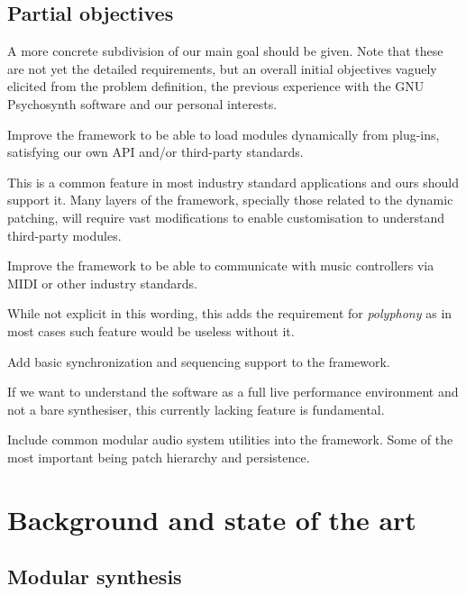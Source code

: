 \subsection{Partial objectives}

A more concrete subdivision of our main goal should be given. Note
that these are not yet the detailed requirements, but an overall
initial objectives vaguely elicited from the problem definition, the
previous experience with the GNU Psychosynth software and our personal
interests.

\begin{objective}
Improve the framework to be able to load modules dynamically from
plug-ins, satisfying our own API and/or third-party standards.
\end{objective}

This is a common feature in most industry standard applications and
ours should support it. Many layers of the framework, specially those
related to the dynamic patching, will require vast modifications to
enable customisation to understand third-party modules.

\begin{objective}
Improve the framework to be able to communicate with music controllers
via MIDI or other industry standards.
\end{objective}

While not explicit in this wording, this adds the requirement for
\emph{polyphony} as in most cases such feature would be useless without
it.

\begin{objective}
Add basic synchronization and sequencing support to the framework.
\end{objective}

If we want to understand the software as a full live performance
environment and not a bare synthesiser, this currently lacking feature
is fundamental.

\begin{objective}
Include common modular audio system utilities into the framework. Some
of the most important being patch hierarchy and persistence. 
\end{objective}


\section{Background and state of the art}

\subsection{Modular synthesis}

